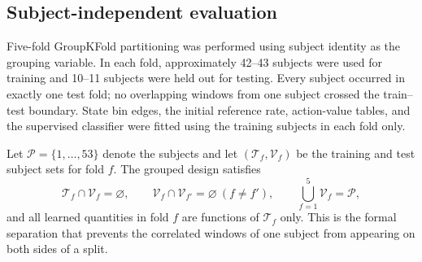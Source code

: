 \documentclass{elektr}
\newcounter{algorithmblock}
\newenvironment{algorithmblock}{%
  \par\medskip\noindent\begin{minipage}{0.96\linewidth}\small
  \setlength{\parindent}{0pt}%
  \hrule height 0.45pt%
  \vspace{4pt}%
}{%
  \vspace{4pt}%
  \hrule height 0.45pt%
  \end{minipage}\par\medskip
}
\newcommand{\algtitle}[1]{%
  \refstepcounter{algorithmblock}\textbf{Algorithm \thealgorithmblock}\quad #1\par\smallskip
}
\newcommand{\algrequire}[1]{\textbf{Require:} #1\par}
\newcommand{\algensure}[1]{\textbf{Ensure:} #1\par\smallskip}
\begin{document}

\subsection{Subject-independent evaluation}

Five-fold GroupKFold partitioning was performed using subject identity as the grouping variable. In each fold, approximately 42--43 subjects were used for training and 10--11 subjects were held out for testing. Every subject occurred in exactly one test fold; no overlapping windows from one subject crossed the train--test boundary. State bin edges, the initial reference rate, action-value tables, and the supervised classifier were fitted using the training subjects in each fold only.

Let $\mathcal{P}=\{1,\ldots,53\}$ denote the subjects and let $(\mathcal{T}_f,\mathcal{V}_f)$ be the training and test subject sets for fold $f$. The grouped design satisfies
\begin{equation}
 \mathcal{T}_f\cap\mathcal{V}_f=\varnothing,\qquad
 \mathcal{V}_f\cap\mathcal{V}_{f'}=\varnothing\ (f\ne f'),\qquad
 \bigcup_{f=1}^{5}\mathcal{V}_f=\mathcal{P},
 \label{eq:groupsplit}
\end{equation}
and all learned quantities in fold $f$ are functions of $\mathcal{T}_f$ only. This is the formal separation that prevents the correlated windows of one subject from appearing on both sides of a split.
\end{document}

